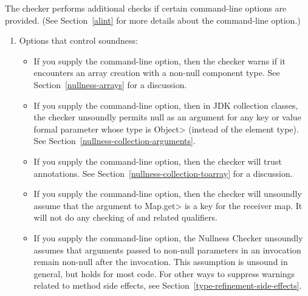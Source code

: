 The checker performs additional checks if certain 
command-line options are provided.  (See
Section~\ref{alint} for more details about the 
command-line option.)



\begin{enumerate}
\item
  Options that control soundness:

\begin{itemize}
\item
  \label{nullness-lint-soundArrayCreationNullness}%
  \label{nullness-lint-nonnullarraycomponents}%
  If you supply the  command-line
  option, then the checker warns if it encounters an array creation
  with a non-null component type.
  See Section~\ref{nullness-arrays} for a discussion.

\item
  \label{collection-object-parameters-may-be-null}
  If you supply the
  command-line option, then in JDK collection classes, the checker
  unsoundly permits null as an argument for any key or value formal
  parameter whose type is \<Object> (instead of the element type).
  See Section~\ref{nullness-collection-arguments}.

\item
  \label{nullness-lint-trustarraylenzero}%
  If you supply the  command-line option, then
  the checker will trust 
  annotations. See Section~\ref{nullness-collection-toarray} for a discussion.

\item
  \label{nullness-assumeKeyFor}%
  If you supply the  command-line option, then the
  checker will unsoundly assume that the argument to \<Map.get> is a key
  for the receiver map.  It will not do any checking of
   and related qualifiers.

\item
  \label{nullness-invocationPreservesArgumentNullness}%
  If you supply the  command-line
  option, the Nullness Checker unsoundly assumes that arguments passed to
  non-null parameters in an invocation remain non-null after the invocation.
  This assumption is unsound in general, but holds for most code.
  For other ways to suppress warnings related to method side effects, see
  Section~\ref{type-refinement-side-effects}.
\end{itemize}


\end{enumerate}
